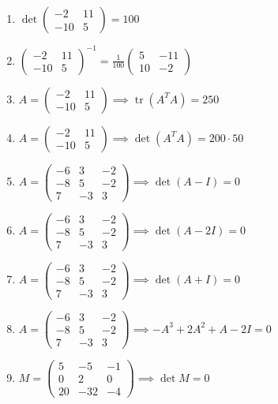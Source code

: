 \documentclass[11pt,a4paper]{article}
\begin{document}
\begin{enumerate}
\item $\displaystyle \det \begin{pmatrix} -2 & 11 \\ -10 & 5 \end{pmatrix} = 100$
\item $\displaystyle \begin{pmatrix} -2 & 11 \\ -10 & 5 \end{pmatrix}^{-1} = \frac{1}{100} \begin{pmatrix} 5 & -11 \\ 10 & -2 \end{pmatrix}$
\item $\displaystyle A = \begin{pmatrix} -2 & 11 \\ -10 & 5 \end{pmatrix} \implies \operatorname{tr}\left( A^{T} A \right) = 250$
\item $\displaystyle A = \begin{pmatrix} -2 & 11 \\ -10 & 5 \end{pmatrix} \implies \det\left( A^{T} A \right) = 200 \cdot 50$
\item $\displaystyle A = \begin{pmatrix} -6 & 3 & -2 \\ -8 & 5 & -2 \\ 7 & -3 & 3 \end{pmatrix} \implies \det\left( A - I \right) = 0$
\item $\displaystyle A = \begin{pmatrix} -6 & 3 & -2 \\ -8 & 5 & -2 \\ 7 & -3 & 3 \end{pmatrix} \implies \det\left( A - 2I \right) = 0$
\item $\displaystyle A = \begin{pmatrix} -6 & 3 & -2 \\ -8 & 5 & -2 \\ 7 & -3 & 3 \end{pmatrix} \implies \det\left( A + I \right) = 0$
\item $\displaystyle A = \begin{pmatrix} -6 & 3 & -2 \\ -8 & 5 & -2 \\ 7 & -3 & 3 \end{pmatrix} \implies -A^{3} + 2A^{2} + A - 2I = 0$
\item $\displaystyle M = \begin{pmatrix} 5 & -5 & -1 \\ 0 & 2 & 0 \\ 20 & -32 & -4 \end{pmatrix} \implies \det M = 0$

\end{enumerate}
\end{document}

